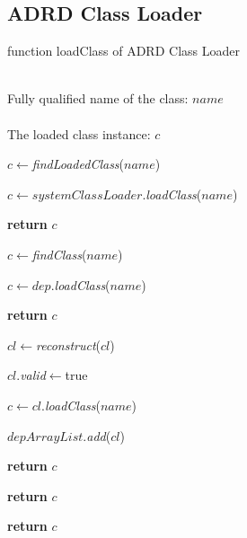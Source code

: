 \documentclass[conference]{IEEEtran}
\begin{document}
\subsection{ADRD Class Loader}

\begin{algorithm}[h]
\caption{function loadClass of ADRD Class Loader}
\label{alg:ADRD_Class_Loader}
\begin{algorithmic}[1]
\REQUIRE ~~\\
Fully qualified name of the class: $name$ \\

\ENSURE ~~\\
The loaded class instance: $c$

\STATE $c\leftarrow$\emph{findLoadedClass}($name$)

	
	
		\STATE $c\leftarrow systemClassLoader.$\emph{loadClass}($name$)
	

			\STATE \textbf{return} $c$
	
		\ENDIF

	\ELSE

		\STATE $c\leftarrow$\emph{findClass}($name$)



				\STATE $c\leftarrow dep.$\emph{loadClass}($name$)

			
					\STATE \textbf{return} $c$

				\ENDIF
			
			\ENDFOR

				


					\STATE $cl\leftarrow$\emph{reconstruct}($cl$)
				
					\STATE $cl.$\emph{valid}$\leftarrow$true

				\ENDIF

				\STATE $c\leftarrow cl.$\emph{loadClass}($name$)


					\STATE $depArrayList$.\emph{add}($cl$)
			
					\STATE \textbf{return} $c$

				\ENDIF
			
			\ENDFOR
	
	
		\ELSE

			\STATE \textbf{return} $c$

		\ENDIF

	\ENDIF

\ELSE

	\STATE \textbf{return} $c$

\ENDIF


\end{algorithmic}
\end{algorithm}
\end{document}
